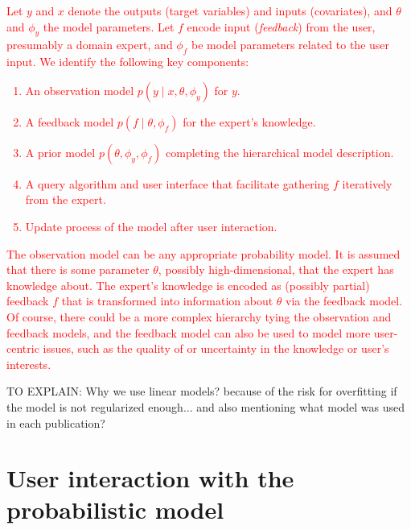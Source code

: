 \documentclass[dissertation,math,vertlayout,pdfa,colorlinks]{aaltoseries}
\begin{document}
\textcolor{red}{Let $y$ and $x$ denote the outputs (target variables) and inputs (covariates), and $\theta$ and $\phi_y$ the model parameters. Let $f$ encode input (\textit{feedback}) from the user, presumably a domain expert, and $\phi_f$ be model parameters related to the user input. We identify the following key components:
	\begin{enumerate}%
		\item An observation model $p(y\mid x,\theta,\phi_y)$ for $y$. %
		\item A feedback model $p(f\mid\theta, \phi_f)$ for the expert's knowledge. %
		\item A prior model $p(\theta, \phi_y, \phi_f)$ completing the hierarchical model description.
		\item A query algorithm and user interface that facilitate gathering $f$ iteratively from the expert.
		\item Update process of the model after user interaction.
	\end{enumerate}
	The observation model can be any appropriate probability model. It is assumed that there is some parameter $\theta$, possibly high-dimensional, that the expert has knowledge about. The expert's knowledge is encoded as (possibly partial) feedback $f$ that is transformed into information about $\theta$ via the feedback model. Of course, there could be a more complex hierarchy tying the observation and feedback models, and the feedback model can also be used to model more user-centric issues, such as the quality of or uncertainty in the knowledge or user's interests.}



TO EXPLAIN: Why we use linear models? because of the risk for overfitting if the model is not regularized enough... and also mentioning what model was used in each publication?

\chapter{User interaction with the probabilistic model}\label{interaction}

\end{document}
